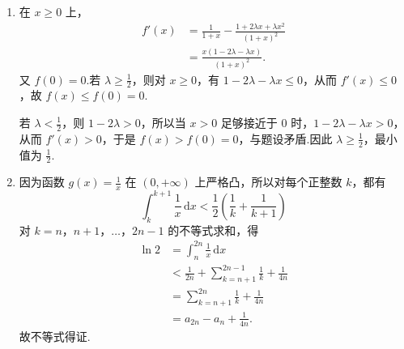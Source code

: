 \begin{solution}
\begin{enumerate}
\item 在 \(x\geqslant0\) 上，
\[
\begin{aligned}
f'(x)
&=\frac{1}{1+x}-\frac{1+2\lambda x+\lambda x^2}{(1+x)^2}\\
&=\frac{x(1-2\lambda-\lambda x)}{(1+x)^2}.
\end{aligned}
\]
又 \(f(0)=0\).若 \(\lambda\geqslant\frac12\)，则对 \(x\geqslant0\)，有 \(1-2\lambda-\lambda x\leqslant0\)，从而 \(f'(x)\leqslant0\)，故 \(f(x)\leqslant f(0)=0\).

若 \(\lambda<\frac12\)，则 \(1-2\lambda>0\)，所以当 \(x>0\) 足够接近于 \(0\) 时，\(1-2\lambda-\lambda x>0\)，从而 \(f'(x)>0\)，于是 \(f(x)>f(0)=0\)，与题设矛盾.因此 \(\lambda\geqslant\frac12\)，最小值为 \(\frac12\).
\item 因为函数 \(g(x)=\frac{1}{x}\) 在 \((0,+\infty)\) 上严格凸，所以对每个正整数 \(k\)，都有
\[
\int_k^{k+1}\frac{1}{x}\,\mathrm{d}x<\frac12\left(\frac{1}{k}+\frac{1}{k+1}\right)
\]
对 \(k=n\)，\(n+1\)，\(\dots\)，\(2n-1\) 的不等式求和，得
\[
\begin{aligned}
\ln2
&=\int_n^{2n}\frac{1}{x}\,\mathrm{d}x\\
&<\frac{1}{2n}+\sum_{k=n+1}^{2n-1}\frac{1}{k}+\frac{1}{4n}\\
&=\sum_{k=n+1}^{2n}\frac{1}{k}+\frac{1}{4n}\\
&=a_{2n}-a_n+\frac{1}{4n}.
\end{aligned}
\]
故不等式得证.
\end{enumerate}
\end{solution}
